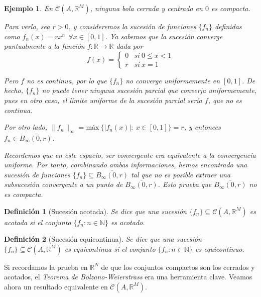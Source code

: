\documentclass[11pt, a4paper]{article}
\newcommand{\fn}{\{f_n\}}
\theoremstyle{theorem-style}
\theoremstyle{definition-style}
\newtheorem*{ndef}{Definición}
\theoremstyle{remark-style}
\theoremstyle{example-style}
\newtheorem{ejemplo}{Ejemplo}[section]
\begin{document}
\begin{ejemplo} En $\mathcal{C}(A,\mathbb{R}^M)$, ninguna bola cerrada y centrada en $0$ es compacta.


Para verlo, sea $r>0$, y consideremos la sucesión de funciones $\fn$ definidas como $f_n(x) = rx^n \ \ \forall x \in [0,1]$. Ya sabemos que la sucesión converge puntualmente a la función $f: \mathbb{R} \to \mathbb{R}$ dada por $$f(x) = \begin{cases} 0 & si\ 0 \le x < 1\\ r & si\ x = 1 \end{cases}$$

Pero $f$ no es continua, por lo que $\fn$ no converge uniformemente en $[0,1]$. De hecho, $\fn$ no puede tener ninguna sucesión parcial que converja uniformemente, pues en otro caso, el límite uniforme de la sucesión parcial sería $f$, que no es continua.

Por otro lado, $\|f_n\|_{\infty} = \text{máx} \ \{ |f_n(x)|:\ x \in [0,1]\} = r$, y entonces $f_n \in \overline{B_{\infty}(0,r)}$. 

Recordemos que en este espacio, ser convergente era equivalente a la convergencia uniforme. Por tanto, combinando ambas informaciones, hemos encontrado una sucesión de funciones $\fn \subseteq \overline{B_{\infty}(0,r)}$ tal que no es posible extraer una subsucesión convergente a un punto de $\overline{B_{\infty}(0,r)}$. Esto prueba que $\overline{B_{\infty}(0,r)}$ no es compacta.
\end{ejemplo}

\begin{ndef}[Sucesión acotada]
	Se dice que una sucesión $\fn \subseteq \mathcal{C}(A,\mathbb{R}^M)$ es acotada si el conjunto $\{ f_n: n \in \mathbb{N}\}$ es acotado. 
\end{ndef}

\begin{ndef}[Sucesión equicontinua]
	Se dice que una sucesión $\fn \subseteq \mathcal{C}(A,\mathbb{R}^M)$ es equicontinua si el conjunto $\{ f_n: n \in \mathbb{N}\}$ es equicontinuo. 
\end{ndef}

Si recordamos la prueba en $\mathbb{R}^N$ de que los conjuntos compactos son los cerrados y acotados, el \textit{Teorema de Bolzano-Weierstrass} era una herramienta clave. Veamos ahora un resultado equivalente en $\mathcal{C}(A,\mathbb{R}^M)$.
\end{document}
